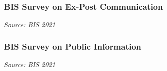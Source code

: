 \documentclass{beamer}
\begin{document}
\begin{frame}
  \frametitle{BIS Survey on Ex-Post Communication}
  \medskip
  \emph{Source: BIS 2021 \href{https://www.bis.org/publ/mc_insights_fxinterventions.pdf}{}}
\end{frame}


\begin{frame}
  \frametitle{BIS Survey on Public Information}
  \medskip
  \emph{Source: BIS 2021 \href{https://www.bis.org/publ/mc_insights_fxinterventions.pdf}{}}
\end{frame}
\end{document}
